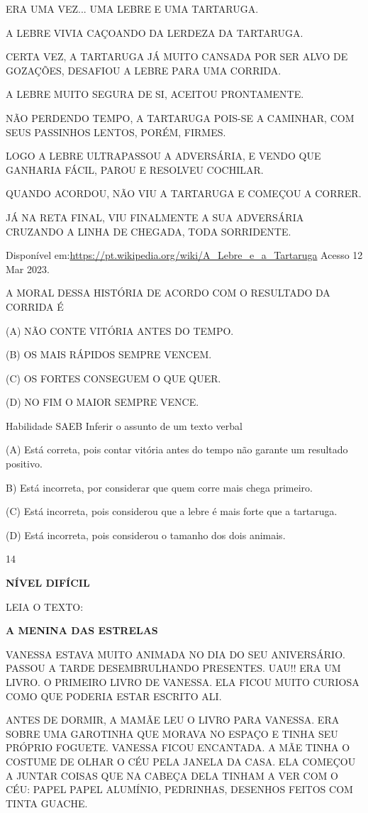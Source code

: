 {{ERA UMA VEZ... UMA LEBRE E UMA TARTARUGA.

A LEBRE VIVIA CAÇOANDO DA LERDEZA DA TARTARUGA.

CERTA VEZ, A TARTARUGA JÁ MUITO CANSADA POR SER ALVO DE GOZAÇÕES,
DESAFIOU A LEBRE PARA UMA CORRIDA.

A LEBRE MUITO SEGURA DE SI, ACEITOU PRONTAMENTE.

NÃO PERDENDO TEMPO, A TARTARUGA POIS-SE A CAMINHAR, COM SEUS PASSINHOS
LENTOS, PORÉM, FIRMES.

LOGO A LEBRE ULTRAPASSOU A ADVERSÁRIA, E VENDO QUE GANHARIA FÁCIL, PAROU
E RESOLVEU COCHILAR.

QUANDO ACORDOU, NÃO VIU A TARTARUGA E COMEÇOU A CORRER.

JÁ NA RETA FINAL, VIU FINALMENTE A SUA ADVERSÁRIA CRUZANDO A LINHA DE
CHEGADA, TODA SORRIDENTE.

Disponível em:\url{https://pt.wikipedia.org/wiki/A_Lebre_e_a_Tartaruga}
Acesso 12 Mar 2023.

A MORAL DESSA HISTÓRIA DE ACORDO COM O RESULTADO DA CORRIDA É

(A) NÃO CONTE VITÓRIA ANTES DO TEMPO.

(B) OS MAIS RÁPIDOS SEMPRE VENCEM.

(C) OS FORTES CONSEGUEM O QUE QUER.

(D) NO FIM O MAIOR SEMPRE VENCE.

Habilidade SAEB Inferir o assunto de um texto verbal

(A) Está correta, pois contar vitória antes do tempo não garante um
resultado positivo.

B) Está incorreta, por considerar que quem corre mais chega primeiro.

(C) Está incorreta, pois considerou que a lebre é mais forte que a
tartaruga.

(D) Está incorreta, pois considerou o tamanho dos dois animais.

\num{14}

\textbf{NÍVEL DIFÍCIL}

LEIA O TEXTO:

\textbf{A MENINA DAS ESTRELAS}

VANESSA ESTAVA MUITO ANIMADA NO DIA DO SEU ANIVERSÁRIO. PASSOU A TARDE
DESEMBRULHANDO PRESENTES. UAU!! ERA UM LIVRO. O PRIMEIRO LIVRO DE
VANESSA. ELA FICOU MUITO CURIOSA COMO QUE PODERIA ESTAR ESCRITO ALI.

ANTES DE DORMIR, A MAMÃE LEU O LIVRO PARA VANESSA. ERA SOBRE UMA
GAROTINHA QUE MORAVA NO ESPAÇO E TINHA SEU PRÓPRIO FOGUETE. VANESSA
FICOU ENCANTADA. A MÃE TINHA O COSTUME DE OLHAR O CÉU PELA JANELA DA
CASA. ELA COMEÇOU A JUNTAR COISAS QUE NA CABEÇA DELA TINHAM A VER COM O
CÉU: PAPEL PAPEL ALUMÍNIO, PEDRINHAS, DESENHOS FEITOS COM TINTA GUACHE.

}}
